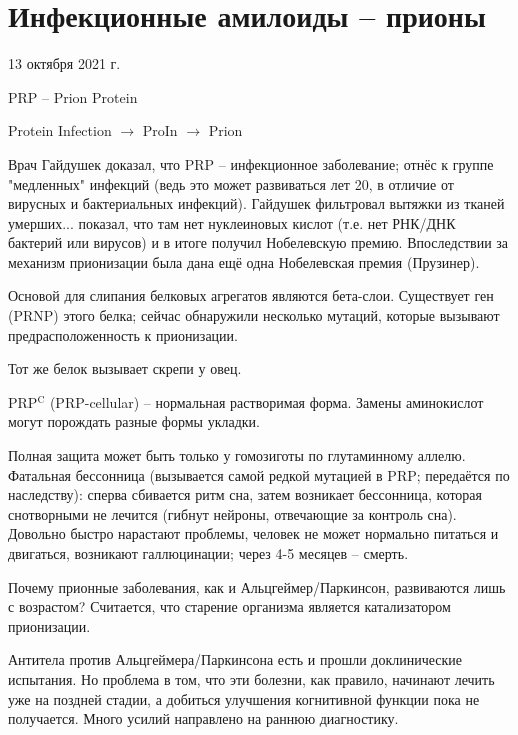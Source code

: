 \documentclass[main.tex]{subfiles}
\begin{document}
\section{ Инфекционные амилоиды -- прионы  }

13 октября 2021 г.

PRP -- Prion Protein

Protein Infection $ \rightarrow $ ProIn $ \rightarrow $ Prion

Врач Гайдушек доказал, что PRP -- инфекционное заболевание; отнёс к группе "медленных" инфекций (ведь это может развиваться лет 20, в отличие от вирусных и бактериальных инфекций).
Гайдушек фильтровал вытяжки из тканей умерших... показал, что там нет нуклеиновых кислот (т.е. нет РНК/ДНК бактерий или вирусов) и в итоге получил Нобелевскую премию.
Впоследствии за механизм прионизации была дана ещё одна Нобелевская премия (Прузинер).

Основой для слипания белковых агрегатов являются бета-слои.
Существует ген (PRNP) этого белка; сейчас обнаружили несколько мутаций, которые вызывают предрасположенность к прионизации.

Тот же белок вызывает скрепи у овец.

PRP$^\text{C} $ (PRP-cellular) -- нормальная растворимая форма.
Замены аминокислот могут порождать разные формы укладки.

Полная защита может быть только у гомозиготы по глутаминному аллелю. \\

Фатальная бессонница (вызывается самой редкой мутацией в PRP; передаётся по наследству): сперва сбивается ритм сна, затем возникает бессонница, которая снотворными не лечится (гибнут нейроны, отвечающие за контроль сна).
Довольно быстро нарастают проблемы, человек не может нормально питаться и двигаться, возникают галлюцинации; через 4-5 месяцев -- смерть.

Почему прионные заболевания, как и Альцгеймер/Паркинсон, развиваются лишь с возрастом?
Считается, что старение организма является катализатором прионизации.

\begin{leftbar}
	Антитела против Альцгеймера/Паркинсона есть и прошли доклинические испытания.
	Но проблема в том, что эти болезни, как правило, начинают лечить уже на поздней стадии, а добиться улучшения когнитивной функции пока не получается.
	Много усилий направлено на раннюю диагностику.
\end{leftbar}
\end{document}
